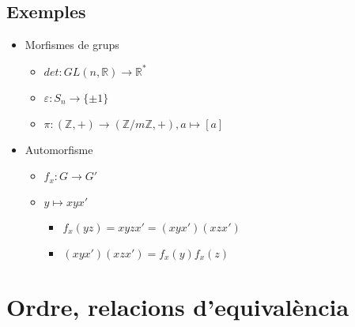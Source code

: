 \documentclass{article}
\newcommand{\Z}{\mathbb{Z}}
\newcommand{\R}{\mathbb{R}}
\begin{document}
\subsection*{Exemples}
\begin{itemize}
\item Morfismes de grups
	\begin{itemize}
	\item $det: GL(n, \R) \to \R^*$
	\item $\varepsilon: S_n \to \{\pm 1\}$
	\item $\pi: (\Z, +) \to (\Z/m\Z, +), a \mapsto [a]$
	\end{itemize}
\item Automorfisme
	\begin{itemize}
	\item $f_x:G\to G'$
	\item $y \mapsto xyx'$
		\begin{itemize}
		\item $f_x(yz) = xyzx' = (xyx')(xzx')$
		\item $(xyx')(xzx') = f_x(y)f_x(z)$
		\end{itemize}
	\end{itemize}
\end{itemize}

\section{Ordre, relacions d'equivalència}
\end{document}
